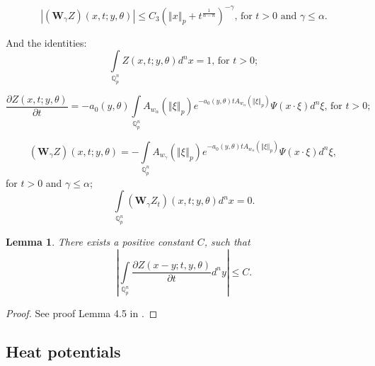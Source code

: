\documentclass{amsart}\usepackage{amsfonts}
\theoremstyle{plain}
\newtheorem{lemma}[theorem]{Lemma}
\numberwithin{equation}{section}
\begin{document}
\begin{equation}
\left\vert \left(  \boldsymbol{W}_{\gamma}Z\right)  (x,t;y,\theta)\right\vert
\leq C_{3}\left(  \left\Vert x\right\Vert _{p}+t^{\frac{1}{\alpha-n}}\right)
^{-\gamma}\text{, for }t>0\text{ and }\gamma\leq\alpha. \label{Est3}\end{equation}


And the identities:\begin{equation}
\underset{\mathbb{Q}_{p}^{n}}{\int}Z(x,t;y,\theta)d^{n}x=1\text{, for }t>0;
\label{Est4}\end{equation}

\begin{equation}
\frac{\partial Z(x,t;y,\theta)}{\partial t}=-a_{0}\left(  y,\theta\right)
\underset{\mathbb{Q}_{p}^{n}}{\int}A_{w_{\alpha}}(\left\Vert \xi\right\Vert
_{p})e^{-a_{0}\left(  y,\theta\right)  tA_{w_{\alpha}}(\left\Vert
\xi\right\Vert _{p})}\Psi(x\cdot\xi)d^{n}\xi\text{, for }t>0; \label{Est5}\end{equation}

\begin{equation}
\left(  \mathbf{W}_{\gamma}Z\right)  (x,t;y,\theta)=-\underset{\mathbb{Q}_{p}^{n}}{\int}A_{w_{\gamma}}(\left\Vert \xi\right\Vert _{p})e^{-a_{0}\left(
y,\theta\right)  tA_{w_{\alpha}}(\left\Vert \xi\right\Vert _{p})}\Psi
(x\cdot\xi)d^{n}\xi\text{, } \label{Est6}\end{equation}
for $t>0$ and $\gamma\leq\alpha$;
\begin{equation}
\underset{\mathbb{Q}_{p}^{n}}{\int}\left(  \boldsymbol{W}_{\gamma}Z_{t}\right)  (x,t;y,\theta)d^{n}x=0. \label{Est7}\end{equation}


\begin{lemma}
There exists a positive constant $C$, such that\begin{equation}
\left\vert \underset{\mathbb{Q}_{p}^{n}}{\int}\frac{\partial Z(x-y;t,y,\theta
)}{\partial t}d^{n}y\right\vert \leq C. \label{Est8}\end{equation}

\end{lemma}

\begin{proof}
See proof Lemma 4.5 in \cite{Koch}.
\end{proof}

\subsection{Heat potentials}
\end{document}
